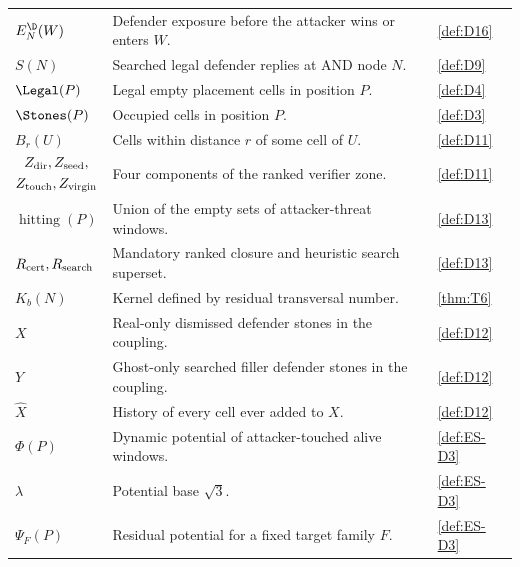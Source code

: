 \begin{table}[!htbp]
\begin{tabular}{@{}p{}p{}p{}@{}}
    $E_N^\D(W)$ & Defender exposure before the attacker wins or enters $W$. & \cref{def:D16} \\
    $S(N)$ & Searched legal defender replies at AND node $N$. & \cref{def:D9} \\
    $\Legal(P)$ & Legal empty placement cells in position $P$. & \cref{def:D4} \\
    $\Stones(P)$ & Occupied cells in position $P$. & \cref{def:D3} \\
    $B_r(U)$ & Cells within distance $r$ of some cell of $U$. & \cref{def:D11} \\
    $\begin{gathered}Z_{\rm dir},Z_{\rm seed},\\Z_{\rm touch},Z_{\rm virgin}\end{gathered}$ & Four components of the ranked verifier zone. & \cref{def:D11} \\
    $\operatorname{hitting}(P)$ & Union of the empty sets of attacker-threat windows. & \cref{def:D13} \\
    $R_{\rm cert},R_{\rm search}$ & Mandatory ranked closure and heuristic search superset. & \cref{def:D13} \\
    $K_b(N)$ & Kernel defined by residual transversal number. & \cref{thm:T6} \\
    $X$ & Real-only dismissed defender stones in the coupling. & \cref{def:D12} \\
    $Y$ & Ghost-only searched filler defender stones in the coupling. & \cref{def:D12} \\
    $\widehat X$ & History of every cell ever added to $X$. & \cref{def:D12} \\
    $\Phi(P)$ & Dynamic potential of attacker-touched alive windows. & \cref{def:ES-D3} \\
    $\lambda$ & Potential base $\sqrt3$. & \cref{def:ES-D3} \\
    $\Psi_F(P)$ & Residual potential for a fixed target family $F$. & \cref{def:ES-D3} \\
    \bottomrule
  \end{tabular}
\end{table}

